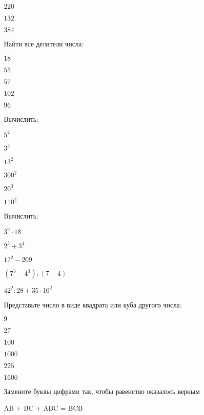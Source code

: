 \begin{class}[number=1]
\begin{listofex}
\begin{enumcols}[itemcolumns=5]
		\item \( 220 \)
		\item \( 132 \)
		\item \( 384 \)
	\end{enumcols}
	\item Найти все делители числа:
	\begin{enumcols}[itemcolumns=5]
		\item \( 18 \)
		\item \( 55 \)
		\item \( 57 \)
		\item \( 102 \)
		\item \( 96 \)
	\end{enumcols}
	\item Вычислить:
	\begin{enumcols}[itemcolumns=6]
		\item \( 5^2 \)
		\item \( 3^3 \)
		\item \( 13^2 \)
		\item \( 300^2 \)
		\item \( 20^3 \)
		\item \( 110^2 \)
	\end{enumcols}
	\item Вычислить:
	\begin{enumcols}[itemcolumns=2]
		\item \( 3^2\cdot18 \)
		\item \( 2^5+3^4\)
		\item \( 17^2-209 \)
		\item \( (7^3-4^3):(7-4) \)
		\item \( 42^2:28+35\cdot10^2 \)
	\end{enumcols}
	\item Представьте число в виде квадрата или куба другого числа:
	\begin{enumcols}[itemcolumns=2]
		\item \( 9 \)
		\item \( 27 \)
		\item \( 100 \)
		\item \( 1000 \)
		\item \( 225 \)
		\item \( 1600 \)
	\end{enumcols}
	\item Замените буквы цифрами так, чтобы равенство оказалось верным
	\begin{enumcols}[itemcolumns=2]
		\item AB + BC + ABC = BCB

\end{enumcols}
\end{listofex}
\end{class}
